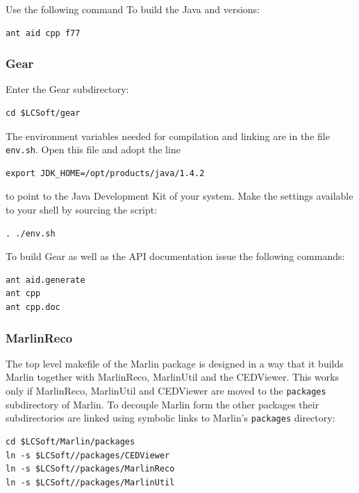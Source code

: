 Use the following command To build the Java and \CPP{} versions:

\begin{verbatim}
ant aid cpp f77 
\end{verbatim}

\subsubsection*{Gear}

Enter the Gear subdirectory:

\begin{verbatim}
cd $LCSoft/gear
\end{verbatim}

The environment variables needed for compilation and linking are in the file 
{\tt env.sh}. Open this file and adopt the line 

\begin{verbatim}
export JDK_HOME=/opt/products/java/1.4.2
\end{verbatim}

to point to the Java Development Kit of your system.
Make the settings available to your shell by sourcing the script:

\begin{verbatim}
. ./env.sh 
\end{verbatim}

To build Gear as well as the API documentation
issue the following commands:

\begin{verbatim}
ant aid.generate 
ant cpp 
ant cpp.doc 
\end{verbatim}

\subsubsection*{MarlinReco}

The top level makefile of the Marlin package is designed in a way that it
builds Marlin together with MarlinReco, MarlinUtil and the CEDViewer. 
This works only if MarlinReco, MarlinUtil and CEDViewer are moved to the 
{\tt packages} subdirectory of Marlin. To decouple Marlin form the
other packages their subdirectories are linked using symbolic links to  
Marlin's {\tt packages} directory:

\begin{verbatim} 
cd $LCSoft/Marlin/packages
ln -s $LCSoft//packages/CEDViewer
ln -s $LCSoft//packages/MarlinReco
ln -s $LCSoft//packages/MarlinUtil
\end{verbatim}

